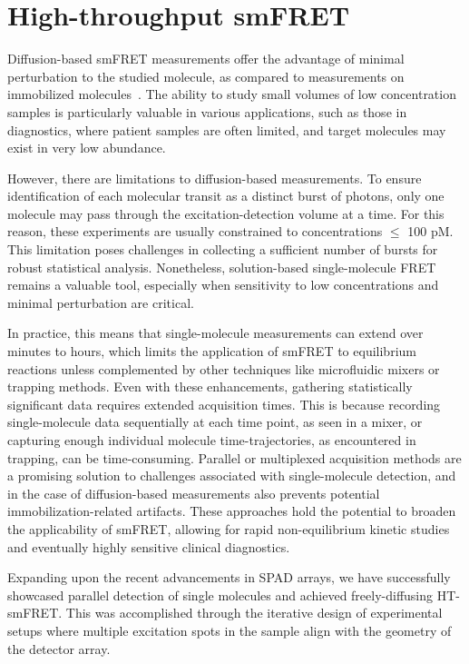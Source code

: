 \chapter{High-throughput smFRET}
\label{chpt:ht-smFRET}

Diffusion-based \ac{smFRET} measurements offer the advantage of minimal perturbation to the studied molecule, as compared to measurements on immobilized molecules~\cite{rhoades_PNAS_2003,selvin_CSHLP_2008,cohen_OE_2008}.
The ability to study small volumes of low concentration samples is particularly valuable in various applications, such as those in diagnostics, where patient samples are often limited, and target molecules may exist in very low abundance. 

However, there are limitations to diffusion-based measurements.
To ensure identification of each molecular transit as a distinct burst of photons, only one molecule may pass through the excitation-detection volume at a time.
For this reason, these experiments are usually constrained to concentrations $\leq$ 100 pM.
This limitation poses challenges in collecting a sufficient number of bursts for robust statistical analysis. 
Nonetheless, solution-based single-molecule FRET remains a valuable tool, especially when sensitivity to low concentrations and minimal perturbation are critical.

In practice, this means that single-molecule measurements can extend over minutes to hours, which limits the application of \ac{smFRET} to equilibrium reactions unless complemented by other techniques like microfluidic mixers or trapping methods. 
Even with these enhancements, gathering statistically significant data requires extended acquisition times. 
This is because recording single-molecule data sequentially at each time point, as seen in a mixer, or capturing enough individual molecule time-trajectories, as encountered in trapping, can be time-consuming. 
Parallel or multiplexed acquisition methods are a promising solution to challenges associated with single-molecule detection,  and in the case of diffusion-based measurements also prevents potential immobilization-related artifacts.
These approaches hold the potential to broaden the applicability of \ac{smFRET}, allowing for rapid non-equilibrium kinetic studies and eventually highly sensitive clinical diagnostics.

Expanding upon the recent advancements in \ac{SPAD} arrays, we have successfully showcased parallel detection of single molecules and achieved freely-diffusing \ac{HT-smFRET}. 
This was accomplished through the iterative design of experimental setups where multiple excitation spots in the sample align with the geometry of the detector array. 

